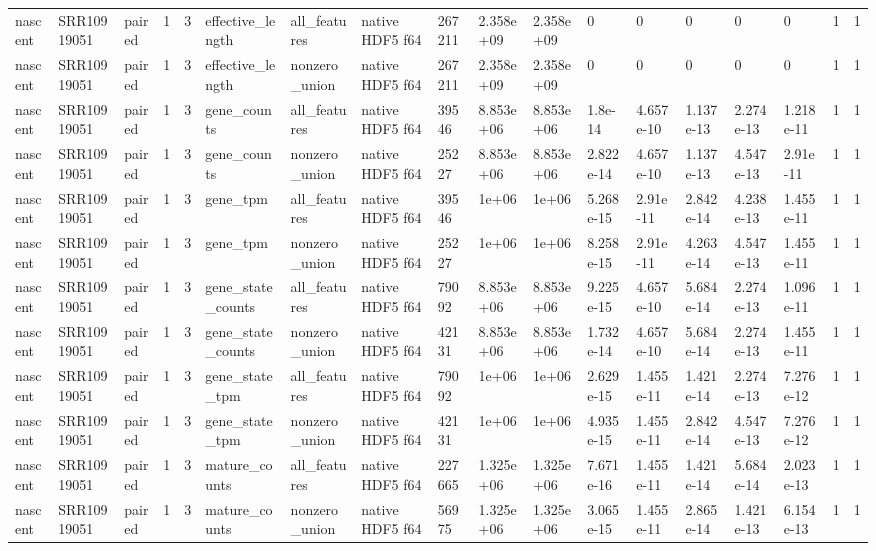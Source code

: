 \begin{tabular}{llllllllllllllllll}
nascent & SRR10919051 & paired & 1 & 3 & effective\_length & all\_features & native HDF5 f64 & 267211 & 2.358e+09 & 2.358e+09 & 0 & 0 & 0 & 0 & 0 & 1 & 1 \\
nascent & SRR10919051 & paired & 1 & 3 & effective\_length & nonzero\_union & native HDF5 f64 & 267211 & 2.358e+09 & 2.358e+09 & 0 & 0 & 0 & 0 & 0 & 1 & 1 \\
nascent & SRR10919051 & paired & 1 & 3 & gene\_counts & all\_features & native HDF5 f64 & 39546 & 8.853e+06 & 8.853e+06 & 1.8e-14 & 4.657e-10 & 1.137e-13 & 2.274e-13 & 1.218e-11 & 1 & 1 \\
nascent & SRR10919051 & paired & 1 & 3 & gene\_counts & nonzero\_union & native HDF5 f64 & 25227 & 8.853e+06 & 8.853e+06 & 2.822e-14 & 4.657e-10 & 1.137e-13 & 4.547e-13 & 2.91e-11 & 1 & 1 \\
nascent & SRR10919051 & paired & 1 & 3 & gene\_tpm & all\_features & native HDF5 f64 & 39546 & 1e+06 & 1e+06 & 5.268e-15 & 2.91e-11 & 2.842e-14 & 4.238e-13 & 1.455e-11 & 1 & 1 \\
nascent & SRR10919051 & paired & 1 & 3 & gene\_tpm & nonzero\_union & native HDF5 f64 & 25227 & 1e+06 & 1e+06 & 8.258e-15 & 2.91e-11 & 4.263e-14 & 4.547e-13 & 1.455e-11 & 1 & 1 \\
nascent & SRR10919051 & paired & 1 & 3 & gene\_state\_counts & all\_features & native HDF5 f64 & 79092 & 8.853e+06 & 8.853e+06 & 9.225e-15 & 4.657e-10 & 5.684e-14 & 2.274e-13 & 1.096e-11 & 1 & 1 \\
nascent & SRR10919051 & paired & 1 & 3 & gene\_state\_counts & nonzero\_union & native HDF5 f64 & 42131 & 8.853e+06 & 8.853e+06 & 1.732e-14 & 4.657e-10 & 5.684e-14 & 2.274e-13 & 1.455e-11 & 1 & 1 \\
nascent & SRR10919051 & paired & 1 & 3 & gene\_state\_tpm & all\_features & native HDF5 f64 & 79092 & 1e+06 & 1e+06 & 2.629e-15 & 1.455e-11 & 1.421e-14 & 2.274e-13 & 7.276e-12 & 1 & 1 \\
nascent & SRR10919051 & paired & 1 & 3 & gene\_state\_tpm & nonzero\_union & native HDF5 f64 & 42131 & 1e+06 & 1e+06 & 4.935e-15 & 1.455e-11 & 2.842e-14 & 4.547e-13 & 7.276e-12 & 1 & 1 \\
nascent & SRR10919051 & paired & 1 & 3 & mature\_counts & all\_features & native HDF5 f64 & 227665 & 1.325e+06 & 1.325e+06 & 7.671e-16 & 1.455e-11 & 1.421e-14 & 5.684e-14 & 2.023e-13 & 1 & 1 \\
nascent & SRR10919051 & paired & 1 & 3 & mature\_counts & nonzero\_union & native HDF5 f64 & 56975 & 1.325e+06 & 1.325e+06 & 3.065e-15 & 1.455e-11 & 2.865e-14 & 1.421e-13 & 6.154e-13 & 1 & 1 \\

\end{tabular}
